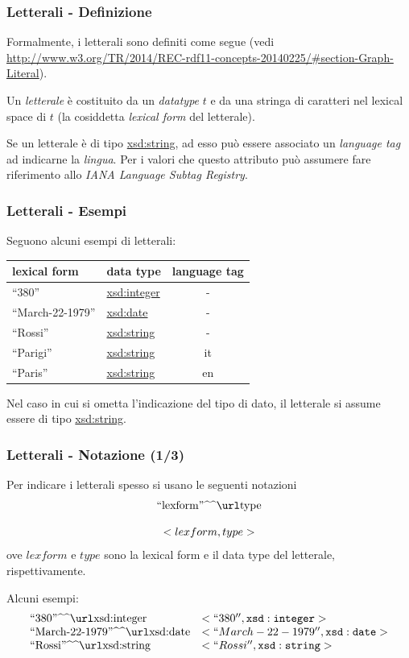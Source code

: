 \documentclass[8pt]{beamer}
\begin{document}
\begin{frame}
\frametitle{Letterali - Definizione}
Formalmente, i letterali sono definiti come segue (vedi 
\url{http://www.w3.org/TR/2014/REC-rdf11-concepts-20140225/\#section-Graph-Literal}).
\vspace{\baselineskip}

Un \emph{letterale} \`e costituito da un \emph{datatype} $t$ e da una 
stringa di caratteri nel lexical space di $t$ (la cosiddetta \emph{lexical form}
del letterale).
\vspace{\baselineskip}

Se un letterale \`e di tipo \url{xsd:string}, ad esso pu\`o essere associato un
\emph{language tag} ad indicarne la \emph{lingua}. Per i valori che questo attributo pu\`o
assumere fare riferimento allo \emph{IANA Language Subtag Registry}.
\end{frame}

\begin{frame}
\frametitle{Letterali - Esempi}
Seguono alcuni esempi di letterali:

\begin{center}
\begin{tabular}{|l|l|c|}
  \hline
  \textbf{lexical form} & \textbf{data type} & \textbf{language tag}\\
  \hline
  ``380'' & \url{xsd:integer} & - \\
  ``March-22-1979'' & \url{xsd:date} & - \\
  ``Rossi'' & \url{xsd:string} & - \\
  ``Parigi'' & \url{xsd:string} & it \\
  ``Paris'' & \url{xsd:string} & en\\
  \hline
\end{tabular}
\end{center}
\vspace{\baselineskip}

Nel caso in cui si ometta l'indicazione del tipo di dato, il letterale si assume essere
di tipo \url{xsd:string}.
\end{frame}


\begin{frame}
\frametitle{Letterali - Notazione (1/3)}
Per indicare i letterali spesso si usano le seguenti notazioni
\[
 \begin{array}{c}
   \literal{lexform}{type} \\
   \\
  < lexform, type >
 \end{array}
\]
ove $lexform$ e $type$ sono la lexical form e il data type del letterale, rispettivamente.
\vspace{\baselineskip}

Alcuni esempi:
\[
\begin{array}{ll}
 \literal{380}{xsd:integer} & <``380'', \mathtt{xsd:integer}>\\
 \literal{March-22-1979}{xsd:date} & <``March-22-1979'', \mathtt{xsd:date}>\\
 \literal{Rossi}{xsd:string} & <``Rossi'', \mathtt{xsd:string}>
\end{array}
\]
\end{frame}
\end{document}
